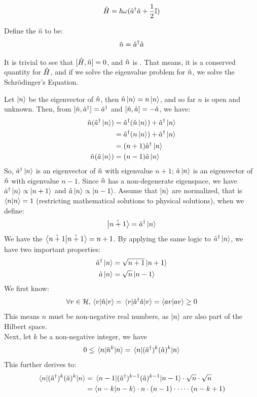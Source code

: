 $$\hat{H} = \hbar \omega (\hat{a}^{\dagger} \hat{a} + \frac{1}{2}\mathbb{I})$$
\begin{definition}
    Define the  $\hat{n}$ to be:
    $$\hat{n} = \hat{a}^{\dagger}\hat{a}$$
\end{definition}
It is trivial to see that $[\hat{H}, \hat{n}] = 0$, and $\hat{n}$ is . That means, it is a conserved quantity for $\hat{H}$, and if we solve the eigenvalue problem for $\hat{n}$, we solve the Schr\"odinger's Equation. \par
Let $\ket{n}$ be the eigenvector of $\hat{n}$, then $\hat{n} \ket{n} = n \ket{n}$, and so far $n$ is open and unknown. Then, from $[\hat{n}, \hat{a}^{\dagger}] = \hat{a}^{\dagger}$ and $[\hat{n}, \hat{a}] = -\hat{a}$, we have:
\begin{align*}
    \hat{n}(\hat{a}^{\dagger}\ket{n}) &= \hat{a}^{\dagger}(\hat{n}\ket{n}) + \hat{a}^{\dagger}\ket{n} \\
    &= \hat{a}^{\dagger}(n\ket{n}) + \hat{a}^{\dagger}\ket{n} \\
    &= (n+1) \hat{a}^{\dagger}\ket{n} \\
    \hat{n}(\hat{a}\ket{n}) &= (n-1)\hat{a}\ket{n}
\end{align*}
So, $\hat{a}^{\dagger}\ket{n}$ is an eigenvector of $\hat{n}$ with eigenvalue $n+1$; $\hat{a}\ket{n}$ is an eigenvector of $\hat{n}$ with eigenvalue $n-1$. Since $\hat{n}$ has a non-degenerate eigenspace, we have $\hat{a}^{\dagger}\ket{n} \propto \ket{n+1}$ and $\hat{a} \ket{n} \propto \ket{n-1}$. Assume that $\ket{n}$ are normalized, that is $\braket{n} = 1$ (restricting mathematical solutions to physical solutions), when we define:
$$\ket{\tilde{n+1}} = \hat{a}^{\dagger} \ket{n}$$
We have the $\braket{\tilde{n+1}} = n + 1$. By applying the same logic to $\hat{a}^{\dagger} \ket{n}$, we have two important properties:
\begin{align*}
    \hat{a}^{\dagger} \ket{n} &= \sqrt{n+1}\ket{n+1} \\
    \hat{a} \ket{n} &= \sqrt{n} \ket{n-1}
\end{align*}
We first know:
$$\forall v \in \mathcal{H}, \mel{v}{\hat{n}}{v} = \mel{v}{\hat{a}^{\dagger}\hat{a}}{v} = \braket{av}{av} \ge 0$$
This means $n$ must be non-negative real numbers, as $\ket{n}$ are also part of the Hilbert space. \\
Next, let $k$ be a non-negative integer, we have
$$0 \le \mel{n}{\hat{n}^k}{n} = \mel{n}{(\hat{a}^{\dagger})^k(\hat{a})^k}{n}$$
This further derives to:
\begin{align*}
    \mel{n}{(\hat{a}^{\dagger})^k(\hat{a})^k}{n} &= \mel{n-1}{(\hat{a}^{\dagger})^{k-1}(\hat{a})^{k-1}}{n-1} \cdot \sqrt{n} \cdot \sqrt{n} \\
    &= \braket{n-k} \cdot n \cdot (n-1) \cdot \dots \cdot (n-k+1)
\end{align*}
